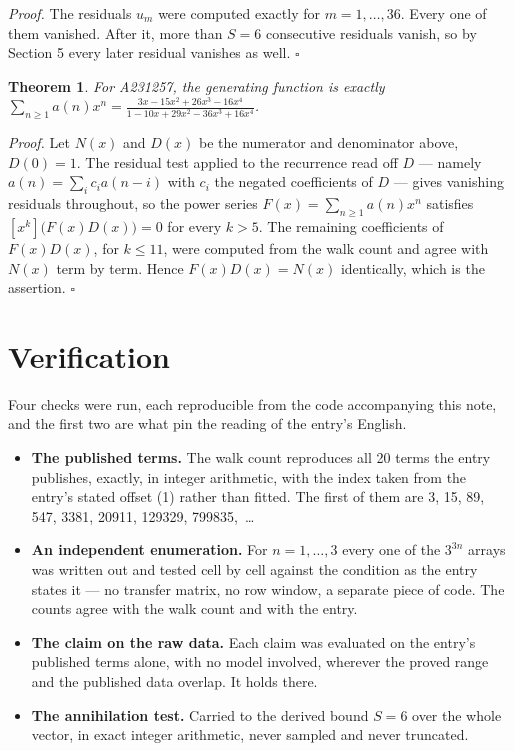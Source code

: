 \documentclass[11pt]{article}
\newtheorem{theorem}{Theorem}
\theoremstyle{definition}
\begin{document}
{\itshape Proof.} The residuals $u_m$ were computed exactly for $m = 1,\dots,36$. Every one of them vanished. After it, more than $S = 6$ consecutive residuals vanish, so by Section 5 every later residual vanishes as well. $\square$

\begin{theorem} For A231257, the generating function is exactly $\sum_{n\ge 1} a(n)x^n = \frac{3x - 15x^{2} + 26x^{3} - 16x^{4}}{1 - 10x + 29x^{2} - 36x^{3} + 16x^{4}}$.\end{theorem}

{\itshape Proof.} Let $N(x)$ and $D(x)$ be the numerator and denominator above, $D(0)=1$. The residual test applied to the recurrence read off $D$ --- namely $a(n) = \sum_i c_i a(n-i)$ with $c_i$ the negated coefficients of $D$ --- gives vanishing residuals throughout, so the power series $F(x)=\sum_{n\ge 1}a(n)x^n$ satisfies $[x^k]\bigl(F(x)D(x)\bigr) = 0$ for every $k > 5$. The remaining coefficients of $F(x)D(x)$, for $k \le 11$, were computed from the walk count and agree with $N(x)$ term by term. Hence $F(x)D(x) = N(x)$ identically, which is the assertion. $\square$

\section{Verification}

Four checks were run, each reproducible from the code accompanying this note, and the first two are what pin the reading of the entry's English.

\begin{itemize}

\item {\bfseries The published terms.} The walk count reproduces all 20 terms the entry publishes, exactly, in integer arithmetic, with the index taken from the entry's stated offset (1) rather than fitted. The first of them are 3, 15, 89, 547, 3381, 20911, 129329, 799835,~\dots

\item {\bfseries An independent enumeration.} For $n = 1,\dots,3$ every one of the $3^{3n}$ arrays was written out and tested cell by cell against the condition as the entry states it --- no transfer matrix, no row window, a separate piece of code. The counts agree with the walk count and with the entry.

\item {\bfseries The claim on the raw data.} Each claim was evaluated on the entry's published terms alone, with no model involved, wherever the proved range and the published data overlap. It holds there.

\item {\bfseries The annihilation test.} Carried to the derived bound $S = 6$ over the whole vector, in exact integer arithmetic, never sampled and never truncated.

\end{itemize}
\end{document}
